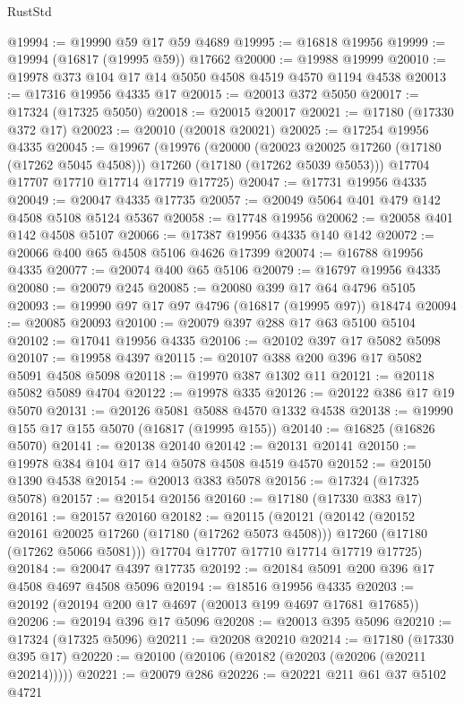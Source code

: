 \begin{lexlean}{RustStd}
\begin{coremodule}
@19994 := @19990 @59 @17 @59 @4689
@19995 := @16818 @19956
@19999 := @19994 (@16817 (@19995 @59)) @17662
@20000 := @19988 @19999
@20010 := @19978 @373 @104 @17 @14 @5050 @4508 @4519 @4570 @1194 @4538
@20013 := @17316 @19956 @4335 @17
@20015 := @20013 @372 @5050
@20017 := @17324 (@17325 @5050)
@20018 := @20015 @20017
@20021 := @17180 (@17330 @372 @17)
@20023 := @20010 (@20018 @20021)
@20025 := @17254 @19956 @4335
@20045 := @19967
    (@19976
      (@20000
        (@20023 @20025 @17260 (@17180 (@17262 @5045 @4508)))
        @17260
        (@17180 (@17262 @5039 @5053)))
      @17704
      @17707
      @17710
      @17714
      @17719
      @17725)
@20047 := @17731 @19956 @4335
@20049 := @20047 @4335 @17735
@20057 := @20049 @5064 @401 @479 @142 @4508 @5108 @5124 @5367
@20058 := @17748 @19956
@20062 := @20058 @401 @142 @4508 @5107
@20066 := @17387 @19956 @4335 @140 @142
@20072 := @20066 @400 @65 @4508 @5106 @4626 @17399
@20074 := @16788 @19956 @4335
@20077 := @20074 @400 @65 @5106
@20079 := @16797 @19956 @4335
@20080 := @20079 @245
@20085 := @20080 @399 @17 @64 @4796 @5105
@20093 := @19990 @97 @17 @97 @4796 (@16817 (@19995 @97)) @18474
@20094 := @20085 @20093
@20100 := @20079 @397 @288 @17 @63 @5100 @5104
@20102 := @17041 @19956 @4335
@20106 := @20102 @397 @17 @5082 @5098
@20107 := @19958 @4397
@20115 := @20107 @388 @200 @396 @17 @5082 @5091 @4508 @5098
@20118 := @19970 @387 @1302 @11
@20121 := @20118 @5082 @5089 @4704
@20122 := @19978 @335
@20126 := @20122 @386 @17 @19 @5070
@20131 := @20126 @5081 @5088 @4570 @1332 @4538
@20138 := @19990 @155 @17 @155 @5070 (@16817 (@19995 @155))
@20140 := @16825 (@16826 @5070)
@20141 := @20138 @20140
@20142 := @20131 @20141
@20150 := @19978 @384 @104 @17 @14 @5078 @4508 @4519 @4570
@20152 := @20150 @1390 @4538
@20154 := @20013 @383 @5078
@20156 := @17324 (@17325 @5078)
@20157 := @20154 @20156
@20160 := @17180 (@17330 @383 @17)
@20161 := @20157 @20160
@20182 := @20115
    (@20121
      (@20142
        (@20152 @20161 @20025 @17260 (@17180 (@17262 @5073 @4508)))
        @17260
        (@17180 (@17262 @5066 @5081)))
      @17704
      @17707
      @17710
      @17714
      @17719
      @17725)
@20184 := @20047 @4397 @17735
@20192 := @20184 @5091 @200 @396 @17 @4508 @4697 @4508 @5096
@20194 := @18516 @19956 @4335
@20203 := @20192 (@20194 @200 @17 @4697 (@20013 @199 @4697 @17681 @17685))
@20206 := @20194 @396 @17 @5096
@20208 := @20013 @395 @5096
@20210 := @17324 (@17325 @5096)
@20211 := @20208 @20210
@20214 := @17180 (@17330 @395 @17)
@20220 := @20100 (@20106 (@20182 (@20203 (@20206 (@20211 @20214)))))
@20221 := @20079 @286
@20226 := @20221 @211 @61 @37 @5102 @4721

\end{coremodule}
\end{lexlean}
